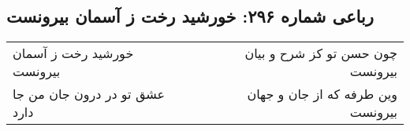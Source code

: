\begin{center}
\section*{رباعی شماره ۲۹۶: خورشید رخت ز آسمان بیرونست}
\label{sec:0296}
\begin{longtable}{l p{0.5cm} r}
خورشید رخت ز آسمان بیرونست
&&
چون حسن تو کز شرح و بیان بیرونست
\\
عشق تو در درون جان من جا دارد
&&
وین طرفه که از جان و جهان بیرونست
\\
\end{longtable}
\end{center}
